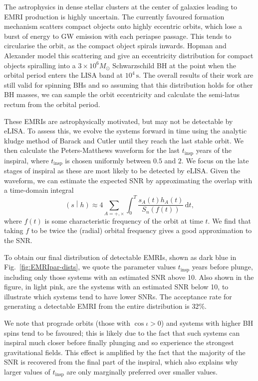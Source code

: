 \documentclass[aps,prd,amsfonts,amssymb,amsmath,nofootinbib,reprint,showpacs,superscriptaddress,twocolumn]{revtex4}
\newcommand{\figref}[1]{Fig.\ \ref{fig:#1}}
\newcommand{\dd}{\ensuremath{\mathrm{d}}}
\newcommand{\intd}[4]{\ensuremath{\int_{#1}^{#2}{#3}\,\dd{#4}}}
\newcommand{\overlap}[2]{\ensuremath{\left(#1\middle|#2\right)}}
\begin{document}
The astrophysics in dense stellar clusters at the center of galaxies leading to EMRI production is highly uncertain. The currently favoured formation mechanism scatters compact objects onto highly eccentric orbits, which lose a burst of energy to GW emission with each periapse passage. This tends to circularise the orbit, as the compact object spirals inwards. Hopman and Alexander \cite{Hopman2005} model this scattering and give an eccentricity distribution for compact objects spiralling into a $3 \times 10^6 M_\odot$ Schwarzschild BH at the point when the orbital period enters the LISA band at $10^4\,\mathrm{s}$. The overall results of their work are still valid for spinning BHs and so assuming that this distribution holds for other BH masses, we can sample the orbit eccentricity and calculate the semi-latus rectum from the orbital period.

These EMRIs are astrophysically motivated, but may not be detectable by eLISA. To assess this, we evolve the systems forward in time using the analytic kludge method of Barack and Cutler \cite{Barack2004} until they reach the last stable orbit. We then calculate the Peters-Matthews waveform \cite{Peters1963} for the last $t_\mathrm{insp}$ years of the inspiral, where $t_\mathrm{insp}$ is chosen uniformly between $0.5$ and $2$. We focus on the late stages of inspiral as these are most likely to be detected by eLISA. Given the waveform, we can estimate the expected SNR by approximating the overlap with a time-domain integral
\begin{equation}
\overlap{s}{h} \approx 4 \sum_{A=+,\times}\intd{0}{T}{\frac{s_A(t)h_A(t)}{S_n(f(t))}}{t},
\end{equation}
where $f(t)$ is some characteristic frequency of the orbit at time $t$. We find that taking $f$ to be twice the (radial) orbital frequency gives a good approximation to the SNR.

To obtain our final distribution of detectable EMRIs, shown as dark blue in \figref{EMRIpar-dists}, we quote the parameter values $t_\mathrm{insp}$ years before plunge, including only those systems with an estimated SNR above 10. Also shown in the figure, in light pink, are the systems with an estimated SNR below 10, to illustrate which systems tend to have lower SNRs. The acceptance rate for generating a detectable EMRI from the entire distribution is $32\%$.

We note that prograde orbits (those with $\cos\iota > 0$) and systems with higher BH spins tend to be favoured; this is likely due to the fact that such systems can inspiral much closer before finally plunging and so experience the strongest gravitational fields. This effect is amplified by the fact that the majority of the SNR is recovered from the final part of the inspiral, which also explains why larger values of $t_\mathrm{insp}$ are only marginally preferred over smaller values.
\end{document}
